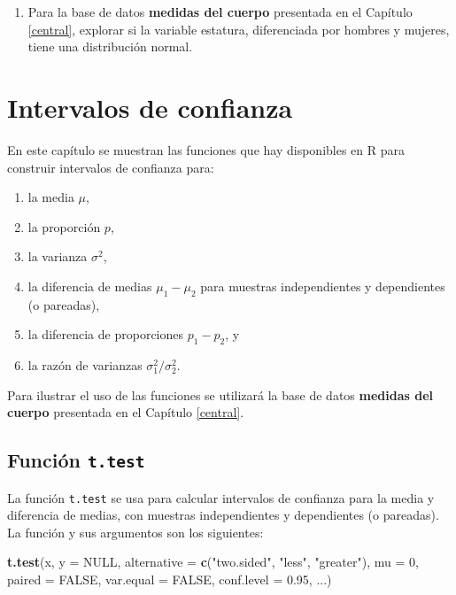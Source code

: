 \documentclass[10pt,]{krantz}
\makeatletter
\newenvironment{Shaded}{\begin{snugshade}}{\end{snugshade}}
\newcommand{\KeywordTok}[1]{\textcolor[rgb]{0.13,0.29,0.53}{\textbf{#1}}}
\newcommand{\DataTypeTok}[1]{\textcolor[rgb]{0.13,0.29,0.53}{#1}}
\newcommand{\DecValTok}[1]{\textcolor[rgb]{0.00,0.00,0.81}{#1}}
\newcommand{\FloatTok}[1]{\textcolor[rgb]{0.00,0.00,0.81}{#1}}
\newcommand{\StringTok}[1]{\textcolor[rgb]{0.31,0.60,0.02}{#1}}
\newcommand{\OtherTok}[1]{\textcolor[rgb]{0.56,0.35,0.01}{#1}}
\newcommand{\NormalTok}[1]{#1}
\providecommand{\tightlist}{%
  \setlength{\itemsep}{0pt}\setlength{\parskip}{0pt}}
\let\proglang=\textsf
\newenvironment{kframe}{%
\medskip{}
\setlength{\fboxsep}{.8em}
 \def\at@end@of@kframe{}%
 \ifinner\ifhmode%
  \def\at@end@of@kframe{\end{minipage}}%
  \begin{minipage}{\columnwidth}%
 \fi\fi%
 \def\FrameCommand##1{\hskip\@totalleftmargin \hskip-\fboxsep
 \colorbox{shadecolor}{##1}\hskip-\fboxsep
     \hskip-\linewidth \hskip-\@totalleftmargin \hskip\columnwidth}%
 \MakeFramed {\advance\hsize-\width
   \@totalleftmargin\z@ \linewidth\hsize
   \@setminipage}}%
 {\par\unskip\endMakeFramed%
 \at@end@of@kframe}
\renewenvironment{Shaded}{\begin{kframe}}{\end{kframe}}
\makeatother
\begin{document}
\begin{enumerate}
\def\labelenumi{\arabic{enumi}.}
\tightlist
\item
  Para la base de datos \textbf{medidas del cuerpo} presentada en el
  Capítulo \ref{central}, explorar si la variable estatura, diferenciada
  por hombres y mujeres, tiene una distribución normal.
\end{enumerate}

\chapter{Intervalos de confianza}\label{intervalos-de-confianza}

En este capítulo se muestran las funciones que hay disponibles en
\proglang{R} para construir intervalos de confianza para:

\begin{enumerate}
\def\labelenumi{\arabic{enumi}.}
\tightlist
\item
  la media \(\mu\),
\item
  la proporción \(p\),
\item
  la varianza \(\sigma^2\),
\item
  la diferencia de medias \(\mu_1-\mu_2\) para muestras independientes y
  dependientes (o pareadas),
\item
  la diferencia de proporciones \(p_1 - p_2\), y
\item
  la razón de varianzas \(\sigma_1^2 / \sigma_2^2\).
\end{enumerate}

Para ilustrar el uso de las funciones se utilizará la base de datos
\textbf{medidas del cuerpo} presentada en el Capítulo \ref{central}.

\section{\texorpdfstring{Función
\texttt{t.test}}{Función t.test}}\label{funcion-t.test}

La función \texttt{t.test} se usa para calcular intervalos de confianza
para la media y diferencia de medias, con muestras independientes y
dependientes (o pareadas). La función y sus argumentos son los
siguientes:

\begin{Shaded}
\begin{Highlighting}[]
\KeywordTok{t.test}\NormalTok{(x, }\DataTypeTok{y =} \OtherTok{NULL}\NormalTok{,}
       \DataTypeTok{alternative =} \KeywordTok{c}\NormalTok{(}\StringTok{"two.sided"}\NormalTok{, }\StringTok{"less"}\NormalTok{, }\StringTok{"greater"}\NormalTok{),}
       \DataTypeTok{mu =} \DecValTok{0}\NormalTok{, }\DataTypeTok{paired =} \OtherTok{FALSE}\NormalTok{, }\DataTypeTok{var.equal =} \OtherTok{FALSE}\NormalTok{,}
       \DataTypeTok{conf.level =} \FloatTok{0.95}\NormalTok{, ...)}
\end{Highlighting}
\end{Shaded}
\end{document}
